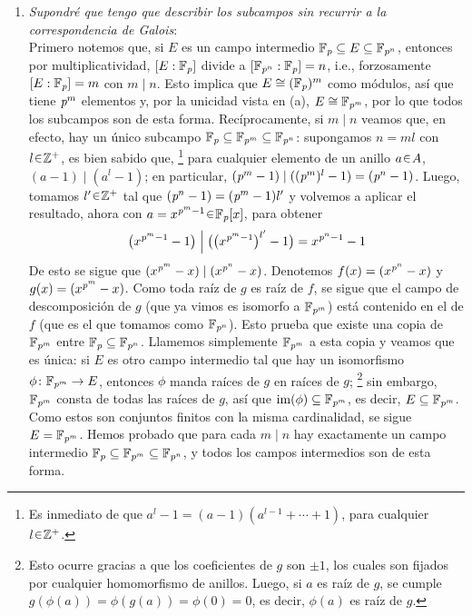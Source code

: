 \begin{sol}
\begin{enumerate}[label=\alph*)]
\item 
\emph{Supondré que tengo que describir los subcampos sin recurrir a la correspondencia de Galois}:\\
Primero notemos que, si $E$ es un campo intermedio $\mathbb{F}_{\operatorname{\textit{p}}} \subseteq E \subseteq \mathbb{F}_{\operatorname{\textit{p}}^n}$, entonces por multiplicatividad, $[E : \mathbb{F}_{\operatorname{\textit{p}}}]$ divide a $[\mathbb{F}_{\operatorname{\textit{p}}^n} : \mathbb{F}_{\operatorname{\textit{p}}}] = n$, i.e., forzosamente $[E : \mathbb{F}_{\operatorname{\textit{p}}}] = m$ con $m \mid n$. Esto implica que $E \cong (\mathbb{F}_{\operatorname{\textit{p}}})^m$ como módulos, así que tiene $\operatorname{\textit{p}}^m$ elementos y, por la unicidad vista en (a), $E \cong \mathbb{F}_{\operatorname{\textit{p}}^m}$, por lo que todos los subcampos son de esta forma. Recíprocamente, si $m \mid n$ veamos que, en efecto, hay un único subcampo $\mathbb{F}_{\operatorname{\textit{p}}} \subseteq \mathbb{F}_{\operatorname{\textit{p}}^m} \subseteq \mathbb{F}_{\operatorname{\textit{p}}^n}$: supongamos $n=ml$ con $l\en\mathbb{Z}^+$, es bien sabido que,%
\footnote{
    Es inmediato de que $a^l-1 = (a-1)(a^{l-1}+\cdots+1)$, para cualquier $l\en\mathbb{Z}^+$.
}
para cualquier elemento de un anillo $a\en A$, $(a-1) \mid (a^l-1)$; en particular, $({\operatorname{\textit{p}}^m}-1) \mid ((\operatorname{\textit{p}}^m)^l-1) = ({\operatorname{\textit{p}}^n}-1)$. Luego, tomamos $l'\en\mathbb{Z}^+$ tal que $({\operatorname{\textit{p}}^n}-1) = ({\operatorname{\textit{p}}^m}-1)l'$ y volvemos a aplicar el resultado, ahora con $a= x^{{\p^m}-1} \en \mathbb{F}_{\p}[x]$, para obtener
\[
\big(x^{{\operatorname{\textit{p}}^m}-1} - 1\big) \;\Big|\; \big( \big(x^{{\operatorname{\textit{p}}^m}-1}\big)^{l'} - 1 \big) = x^{{\operatorname{\textit{p}}^n}-1} - 1
\]
De esto se sigue que $(x^{\operatorname{\textit{p}}^m}-x) \mid (x^{\operatorname{\textit{p}}^n}-x)$. Denotemos $f(x) = (x^{\operatorname{\textit{p}}^n}-x)$ y $g(x) = (x^{\operatorname{\textit{p}}^m}-x)$. Como toda raíz de $g$ es raíz de $f$, se sigue que el campo de descomposición de $g$ (que ya vimos es isomorfo a $\mathbb{F}_{\operatorname{\textit{p}}^m}$) está contenido en el de $f$ (que es el que tomamos como $\mathbb{F}_{\operatorname{\textit{p}}^n}$). Esto prueba que existe una copia de $\mathbb{F}_{\operatorname{\textit{p}}^m}$ entre $\mathbb{F}_{\operatorname{\textit{p}}} \subseteq \mathbb{F}_{\operatorname{\textit{p}}^n}$. Llamemos simplemente $\mathbb{F}_{\operatorname{\textit{p}}^m}$ a esta copia y veamos que es única: si $E$ es otro campo intermedio tal que hay un isomorfismo $\phi \colon \mathbb{F}_{\operatorname{\textit{p}}^m} \to E$, entonces $\phi$ manda raíces de $g$ en raíces de $g$;%
\footnote{
    Esto ocurre gracias a que los coeficientes de $g$ son $\pm1$, los cuales son fijados por cualquier homomorfismo de anillos. Luego, si $a$ es raíz de $g$, se cumple $g(\phi(a)) = \phi(g(a)) = \phi(0) = 0$, es decir, $\phi(a)$ es raíz de $g$.
}
sin embargo, $\mathbb{F}_{\operatorname{\textit{p}}^m}$ consta de todas las raíces de $g$, así que $\operatorname{im}(\phi) \subseteq \mathbb{F}_{\operatorname{\textit{p}}^m}$, es decir, $E\subseteq \mathbb{F}_{\operatorname{\textit{p}}^m}$. Como estos son conjuntos finitos con la misma cardinalidad, se sigue $E = \mathbb{F}_{\operatorname{\textit{p}}^m}$. Hemos probado que para cada $m\mid n$ hay exactamente un campo intermedio $\mathbb{F}_{\operatorname{\textit{p}}} \subseteq\mathbb{F}_{\operatorname{\textit{p}}^m} \subseteq\mathbb{F}_{\operatorname{\textit{p}}^n}$, y todos los campos intermedios son de esta forma.\par

\end{enumerate}
\end{sol}
